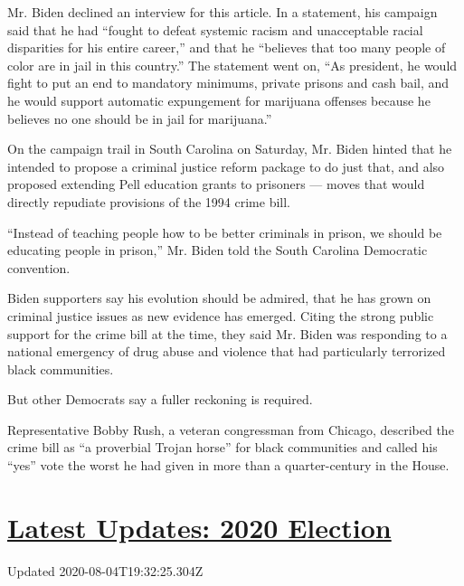 Mr. Biden declined an interview for this article. In a statement, his
campaign said that he had ``fought to defeat systemic racism and
unacceptable racial disparities for his entire career,'' and that he
``believes that too many people of color are in jail in this country.''
The statement went on, ``As president, he would fight to put an end to
mandatory minimums, private prisons and cash bail, and he would support
automatic expungement for marijuana offenses because he believes no one
should be in jail for marijuana.''

On the campaign trail in South Carolina on Saturday, Mr. Biden hinted
that he intended to propose a criminal justice reform package to do just
that, and also proposed extending Pell education grants to prisoners ---
moves that would directly repudiate provisions of the 1994 crime bill.

``Instead of teaching people how to be better criminals in prison, we
should be educating people in prison,'' Mr. Biden told the South
Carolina Democratic convention.

Biden supporters say his evolution should be admired, that he has grown
on criminal justice issues as new evidence has emerged. Citing the
strong public support for the crime bill at the time, they said Mr.
Biden was responding to a national emergency of drug abuse and violence
that had particularly terrorized black communities.

But other Democrats say a fuller reckoning is required.

Representative Bobby Rush, a veteran congressman from Chicago, described
the crime bill as ``a proverbial Trojan horse'' for black communities
and called his ``yes'' vote the worst he had given in more than a
quarter-century in the House.

\hypertarget{latest-updates-2020-election}{%
\section{\texorpdfstring{\href{https://www.nytimes3xbfgragh.onion/2020/08/04/us/elections/primary-election-michigan-arizona-kansas.html?action=click\&pgtype=Article\&state=default\&region=MAIN_CONTENT_1\&context=storylines_live_updates}{Latest
Updates: 2020
Election}}{Latest Updates: 2020 Election}}\label{latest-updates-2020-election}}

Updated 2020-08-04T19:32:25.304Z

